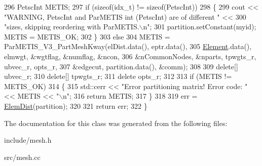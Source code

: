 \begin{DoxyCode}
296   PetscInt METIS;
297   \textcolor{keywordflow}{if} (\textcolor{keyword}{sizeof}(idx\_t) != \textcolor{keyword}{sizeof}(PetscInt))
298   \{
299     cout << \textcolor{stringliteral}{"WARNING, PetscInt and ParMETIS int (PetscInt) are of different "} <<
300             \textcolor{stringliteral}{"sizes, skipping reordering with ParMETIS.\(\backslash\)n"};
301     partition.setConstant(myid); METIS = METIS\_OK;
302   \}
303   \textcolor{keywordflow}{else}
304     METIS = ParMETIS\_V3\_PartMeshKway(elDist.data(), eptr.data(),
305             \mbox{\hyperlink{class_element}{Element}}.data(), elmwgt, &wgtflag, &numflag, &ncon,
306             &nCommonNodes, &nparts, tpwgts\_r, ubvec\_r, opts\_r,
307             &edgecut, partition.data(), &comm);
308   
309   \textcolor{keyword}{delete}[] ubvec\_r;
310   \textcolor{keyword}{delete}[] tpwgts\_r;
311   \textcolor{keyword}{delete} opts\_r;
312 
313   \textcolor{keywordflow}{if} (METIS != METIS\_OK)
314   \{
315     std::cerr << \textcolor{stringliteral}{"Error partitioning matrix! Error code: "} << METIS << \textcolor{stringliteral}{"\(\backslash\)n"};
316     \textcolor{keywordflow}{return} METIS;
317   \}
318 
319   err = \mbox{\hyperlink{class_mesh_a1c915802d56c4ded24e460e83cfb5399}{ElemDist}}(partition);
320 
321   \textcolor{keywordflow}{return} err;
322 \}
\end{DoxyCode}


The documentation for this class was generated from the following files\+:\begin{DoxyCompactItemize}
\item 
include/mesh.\+h\item 
src/mesh.\+cc\end{DoxyCompactItemize}
